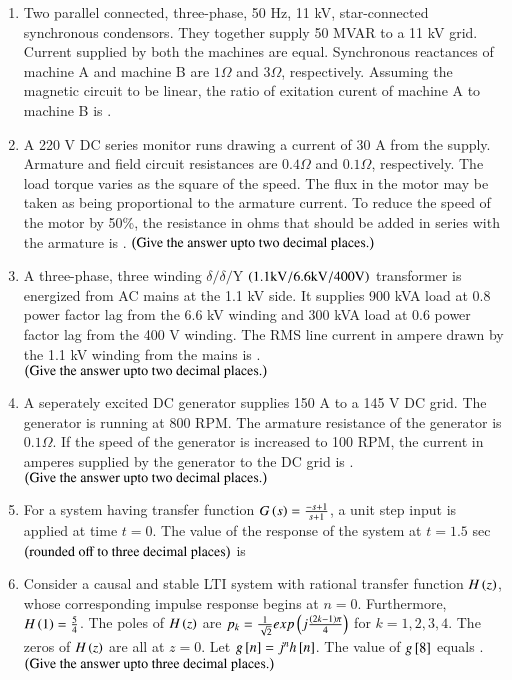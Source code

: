 \documentclass[journal]{IEEEtran}
\numberwithin{equation}{enumi}
\numberwithin{figure}{enumi}
\begin{document}
\begin{enumerate}
\item Two parallel connected, three-phase, 50 Hz, 11 kV, star-connected synchronous condensors. They together supply 50 MVAR to a 11 kV grid. Current supplied by both the machines are equal. Synchronous reactances of machine A and machine B are $1 \Omega$ and $3 \Omega$, respectively. Assuming the magnetic circuit to be linear, the ratio of exitation curent of machine A to machine B is \underline{\hspace{1cm}}.
\item A 220 V DC series monitor runs drawing a current of 30 A from the supply. Armature and field circuit resistances are $0.4 \Omega$ and $0.1 \Omega$, respectively. The load torque varies as the square of the speed. The flux in the motor may be taken as being proportional to the armature current. To reduce the speed of the motor by 50\%, the resistance in ohms that should be added in series with the armature is \underline{\hspace{1cm}}. $\left(\text{Give the answer upto two decimal places.}\right)$
\item A three-phase, three winding $\delta/\delta/\text{Y}$ $\left(1.1 \text{kV}/6.6 \text{kV}/400 \text{V}\right)$ transformer is energized from AC mains at the 1.1 kV side. It supplies 900 kVA load at 0.8 power factor lag from the 6.6 kV winding and 300 kVA load at 0.6 power factor lag from the 400 V winding. The RMS line current in ampere drawn by the 1.1 kV winding from the mains is \underline{\hspace{1cm}}. $\left(\text{Give the answer upto two decimal places.}\right)$
\item A seperately excited DC generator supplies 150 A to a 145 V DC grid. The generator is running at 800 RPM. The armature resistance of the generator is $0.1 \Omega$. If the speed of the generator is increased to 100 RPM, the current in amperes supplied by the generator to the DC grid is \underline{\hspace{1cm}}. $\left(\text{Give the answer upto two decimal places.}\right)$
\item For a system having transfer function $G\left(s\right) = \frac{-s + 1}{s + 1}$, a unit step input is applied at time $t = 0$. The value of the response of the system at $t = 1.5$ sec $\left(\text{rounded off to three decimal places}\right)$ is \underline{\hspace{1.5cm}}
\item Consider a causal and stable LTI system with rational transfer function $H\left(z\right)$, whose corresponding impulse response begins at $n = 0$. Furthermore, $H\left(1\right) = \frac{5}{4}$. The poles of $H\left(z\right)$ are $p_k = \frac{1}{\sqrt{2}} exp\left(j\frac{\left(2k - 1\right)\pi}{4}\right)$ for $k = 1, 2, 3, 4$. The zeros of $H\left(z\right)$ are all at $z = 0$. Let $g{}\left[n\right] = j^nh{}\left[n\right]$. The value of $g{}\left[8\right]$ equals \underline{\hspace{1cm}}. $\left(\text{Give the answer upto three decimal places.}\right)$

\end{enumerate}
\end{document}
